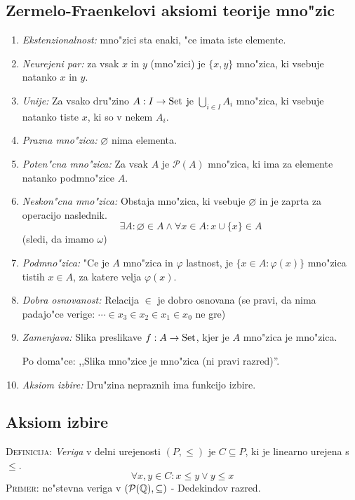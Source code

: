 \subsection{Zermelo-Fraenkelovi aksiomi teorije mno"zic}
\begin{enumerate}
	\item \emph{Ekstenzionalnost:} mno"zici sta enaki, "ce imata iste elemente.

	\item \emph{Neurejeni par:} za vsak $x$ in $y$ (mno"zici) je $\{x, y\}$ mno"zica, ki vsebuje natanko $x$ in $y$.
	
	\item \emph{Unije:} Za vsako dru"zino $A: I \to \text{Set}$ je $\bigcup_{i \in I} A_i$ mno"zica, ki vsebuje natanko tiste $x$, ki so v nekem $A_i$.
	
	\item \emph{Prazna mno"zica:} $\varnothing$ nima elementa.

	\item \emph{Poten"cna mno"zica:} Za vsak $A$ je $\mathcal{P}(A)$ mno"zica, ki ima za elemente natanko podmno"zice $A$.
	
	\item \emph{Neskon"cna mno"zica:} Obstaja mno"zica, ki vsebuje $\varnothing$ in je zaprta za operacijo naslednik.
	\begin{equation*}
	\exists A : \varnothing \in A \land \forall x \in A: x \cup \{x\} \in A
	\end{equation*}
	(sledi, da imamo $\omega$)

	\item \emph{Podmno"zica:} "Ce je $A$ mno"zica in $\varphi$ lastnost, je $\{x \in A: \varphi(x)\}$ mno"zica tistih $x \in A$, za katere velja $\varphi(x)$.
	
	\item \emph{Dobra osnovanost:} Relacija $\in$ je dobro osnovana (se pravi, da nima padajo"ce verige: $\cdots \in x_3 \in x_2 \in x_1 \in x_0$ ne gre)
	
	\item \emph{Zamenjava:} Slika preslikave $f: A \to \text{Set}$, kjer je $A$ mno"zica je mno"zica. 
	
	Po doma"ce: ,,Slika mno"zice je mno"zica (ni pravi razred)''.
	
	\item \emph{Aksiom izbire:} Dru"zina nepraznih ima funkcijo izbire.
\end{enumerate}
%
\subsection{Aksiom izbire}
\textsc{Definicija:} \emph{Veriga} v delni urejenosti $(P, \leq)$ je $C \subseteq P$, ki je linearno urejena s $\leq$.
\begin{equation*}
\forall x, y \in C: x \leq y \lor y \leq x
\end{equation*}
\textsc{Primer:} ne"stevna veriga v $(\mathcal{P}(\mathbb{Q}), \subseteq)$ - Dedekindov razred.

